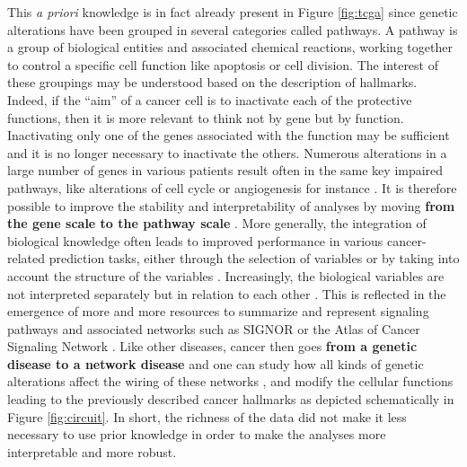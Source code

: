 \documentclass[a4paper,12pt,twoside,onecolumn,openright,final,oldfontcommands]{memoir}
\begin{document}
This \emph{a priori} knowledge is in fact already present in Figure
\ref{fig:tcga} since genetic alterations have been grouped in several
categories called pathways. A pathway is a group of biological entities
and associated chemical reactions, working together to control a
specific cell function like apoptosis or cell division. The interest of
these groupings may be understood based on the description of hallmarks.
Indeed, if the ``aim'' of a cancer cell is to inactivate each of the
protective functions, then it is more relevant to think not by gene but
by function. Inactivating only one of the genes associated with the
function may be sufficient and it is no longer necessary to inactivate
the others. Numerous alterations in a large number of genes in various
patients result often in the same key impaired pathways, like
alterations of cell cycle or angiogenesis for instance
\citep{jones2008core}. It is therefore possible to improve the stability
and interpretability of analyses by moving \textbf{from the gene scale
to the pathway scale} \citep{drier2013pathway}. More generally, the
integration of biological knowledge often leads to improved performance
in various cancer-related prediction tasks, either through the selection
of variables or by taking into account the structure of the variables
\citep{bilal2013improving, ferranti2017value}. Increasingly, the
biological variables are not interpreted separately but in relation to
each other \citep{barabasi2004network}. This is reflected in the
emergence of more and more resources to summarize and represent
signaling pathways and associated networks such as SIGNOR
\citep{perfetto2016signor} or the Atlas of Cancer Signaling Network
\citep{kuperstein2015atlas}. Like other diseases, cancer then goes
\textbf{from a genetic disease to a network disease}
\citep{del2010diseases} and one can study how all kinds of genetic
alterations affect the wiring of these networks
\citep{pawson2007oncogenic}, and modify the cellular functions leading
to the previously described cancer hallmarks as depicted schematically
in Figure \ref{fig:circuit}. In short, the richness of the data did not
make it less necessary to use prior knowledge in order to make the
analyses more interpretable and more robust.
\end{document}
